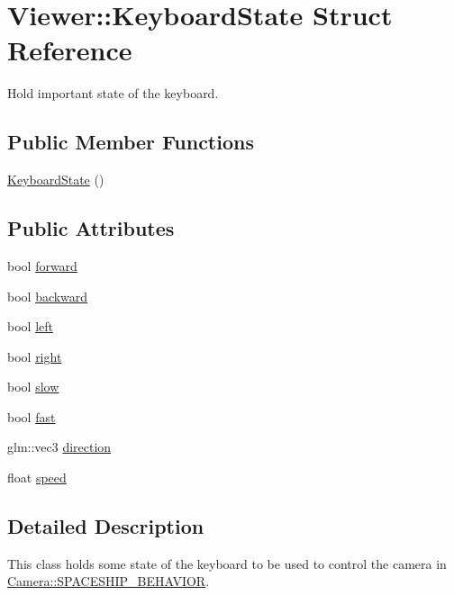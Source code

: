 \hypertarget{structViewer_1_1KeyboardState}{\section{Viewer\+:\+:Keyboard\+State Struct Reference}
\label{structViewer_1_1KeyboardState}
}


Hold important state of the keyboard.  


\subsection*{Public Member Functions}
\begin{DoxyCompactItemize}
\item 
\hyperlink{structViewer_1_1KeyboardState_af73a5d7ed50f2c0a7ae4ab3f37577ab9}{Keyboard\+State} ()
\end{DoxyCompactItemize}
\subsection*{Public Attributes}
\begin{DoxyCompactItemize}
\item 
bool \hyperlink{structViewer_1_1KeyboardState_a5c245f0e0618b27dd1a2ecc83277825c}{forward}
\item 
bool \hyperlink{structViewer_1_1KeyboardState_ae3af61ec3a7e90d8b6e0dca232508a32}{backward}
\item 
bool \hyperlink{structViewer_1_1KeyboardState_a6da2f13c62cd2bfa2b54d724849561c0}{left}
\item 
bool \hyperlink{structViewer_1_1KeyboardState_ab99ed857a88dfc02666c1f46c54a399b}{right}
\item 
bool \hyperlink{structViewer_1_1KeyboardState_a27fd5febb1ceab3d525a1a59cedc3160}{slow}
\item 
bool \hyperlink{structViewer_1_1KeyboardState_a9b2f5ee6733f34e62661390a01a39720}{fast}
\item 
glm\+::vec3 \hyperlink{structViewer_1_1KeyboardState_a41149944b601d2317b64020e76474cb8}{direction}
\item 
float \hyperlink{structViewer_1_1KeyboardState_a8e513c17dc12608e1a15eceb2697ed16}{speed}
\end{DoxyCompactItemize}


\subsection{Detailed Description}
This class holds some state of the keyboard to be used to control the camera in \hyperlink{classCamera_a39b92a45686a6f858a3405ee34a95cfaa37a95995e7b876b0b9994a131da60717}{Camera\+::\+S\+P\+A\+C\+E\+S\+H\+I\+P\+\_\+\+B\+E\+H\+A\+V\+I\+O\+R}. 

